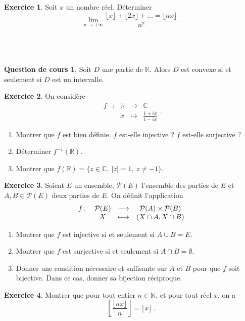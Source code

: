 \documentclass[12pt,a4paper]{amsart}
\theoremstyle{definition}
\newtheorem*{question}{\sc Question de cours}
\newtheorem{exercice}{\sc Exercice}[section]
\newcommand{\N}{\mathbb{N}}
\newcommand{\R}{\mathbb{R}}
\newcommand{\C}{\mathbb{C}}
\newcommand{\too}{\longrightarrow}
\newcommand{\mapstoo}{\longmapsto}
\begin{document}
\begin{exercice}
	Soit $x$ un nombre réel. Déterminer
	\[
		\lim_{n\to +\infty} \frac{\lfloor x\rfloor+\lfloor 2x\rfloor+ \ldots = \lfloor nx\rfloor}{n^2} \ .
	\]
\end{exercice}
\begin{solution}

\end{solution}

~
\newpage
\section{}
\subsection{}

\begin{question}
	Soit $D$ une partie de $\R$. Alors $D$ est convexe si et seulement si $D$ est un intervalle.
\end{question}

\begin{exercice}
	On considère
	\[ \begin{array}{ccccc}
	f & : & \R & \to & \C \\
	 & & x & \mapsto & \frac{1+ix}{1-ix}
	\end{array} .\]
	\begin{enumerate}
	 \item Montrer que $f$ est bien définie. $f$ est-elle injective ? $f$ est-elle surjective ?
	 \item Déterminer $f^{-1}(\mathbb R)$.
	 \item Montrer que $f(\mathbb R)=\{z\in\mathbb C,\ |z|=1,\ z\neq-1\}$.
	\end{enumerate}
\end{exercice}

\begin{exercice}
	Soient $E$ un ensemble, $\mathcal{P}(E)$ l'ensemble des parties de $E$ et $A,B \in \mathcal{P}(E)$ deux parties de $E$. On définit l'application  
	\[
		\begin{array}[]{rccc}
			f \colon & \mathcal{P}(E) & \too & \mathcal{P}(A) \times \mathcal{P}(B) \\
			& X & \mapstoo & (X\cap A, X\cap B)
		\end{array}
	\]
	\begin{enumerate}
		\item Montrer que $f$ est injective si et seulement si $A\cup B = E$.
		\item Montrer que $f$ est surjective si et seulement si $A \cap B = \emptyset$.
		\item Donner une condition nécessaire et suffisante sur $A$ et $B$ pour que $f$ soit bijective. Dans ce cas, donner sa bijection réciproque.
	\end{enumerate}
\end{exercice}

\begin{exercice}
	Montrer que pour tout entier $n\in\N$, et pour tout réel $x$, on a 
	\[
		\left\lfloor \frac{\lfloor nx \rfloor}{n}	\right\rfloor = \lfloor x \rfloor \ .
	\]
\end{exercice}
\end{document}
